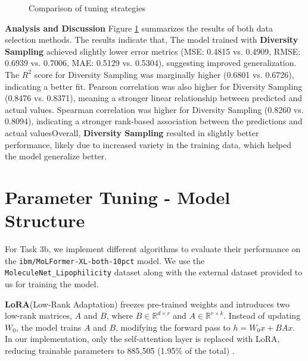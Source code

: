 \documentclass[11pt]{article}
\begin{document}
\begin{figure}[htp]
    \centering
    \caption{Comparison of tuning strategies }
    \label{fig:task3a}
\end{figure}



\textbf{Analysis and Discussion}
Figure \ref{fig:task3a} summarizes the results of both data selection methods. The results indicate that, The model trained with \textbf{Diversity Sampling} achieved slightly lower error metrics (MSE: 0.4815 vs. 0.4909, RMSE: 0.6939 vs. 0.7006, MAE: 0.5129 vs. 0.5304), suggesting improved generalization. The $R^2$ score for Diversity Sampling was marginally higher (0.6801 vs. 0.6726), indicating a better fit. Pearson correlation was also higher for Diversity Sampling (0.8476 vs. 0.8371), meaning a stronger linear relationship between predicted and actual values. Spearman correlation was higher for Diversity Sampling (0.8260 vs. 0.8094), indicating a stronger rank-based association between the predictions and actual valuesOverall, \textbf{Diversity Sampling} resulted in slightly better performance, likely due to increased variety in the training data, which helped the model generalize better.


\section*{Parameter Tuning - Model Structure}
For Task 3b, we implement different algorithms to evaluate their performance on the \texttt{ibm/MoLFormer-XL-both-10pct} model. We use the \texttt{MoleculeNet\_Lipophilicity} dataset along with the external dataset provided to us for training the model.


\textbf{LoRA}(Low-Rank Adaptation) freezes pre-trained weights and introduces two low-rank matrices, \( A \) and \( B \), where \( B \in \mathbb{R}^{d \times r} \) and \( A \in \mathbb{R}^{r \times k} \). Instead of updating \( W_0 \), the model trains \( A \) and \( B \), modifying the forward pass to \( h = W_0x + BAx \). In our implementation, only the self-attention layer is replaced with LoRA, reducing trainable parameters to 885,505 (1.95\% of the total) \cite{hu2021loralowrankadaptationlarge}.
\end{document}
